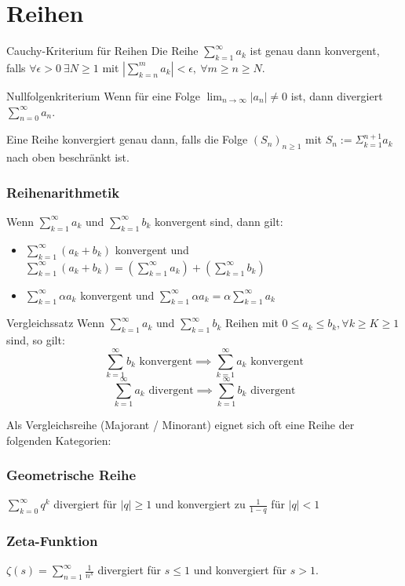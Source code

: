 \documentclass[a4paper,10pt]{article}
\def\limn{\lim_{n\to \infty}}
\def\sumk{\sum_{k=1}^\infty}
\def\sumn{\sum_{n=0}^\infty}
\begin{document}
\section{Reihen}

\begin{mainbox}{Cauchy-Kriterium für Reihen}
Die Reihe $\sumk a_k$ ist genau dann konvergent, falls $\forall \epsilon > 0 \ \exists N \ge 1$ mit $| \sum_{k=n}^m a_k | < \epsilon, \ \forall m \ge n \ge N$.
\end{mainbox}

\begin{subbox}{Nullfolgenkriterium}
 Wenn für eine Folge $\limn |a_n| \ne 0$ ist, dann divergiert $\sumn a_n$.
\end{subbox}

Eine Reihe konvergiert genau dann, falls die Folge $(S_n)_{n \geq 1}$ mit $S_n := \Sigma_{k=1}^{n+1} a_k$ nach oben beschränkt ist.

\subsubsection{Reihenarithmetik}
Wenn $\sumk a_k$ und $\sumk b_k$ konvergent sind, dann gilt:
\begin{itemize}
 \item $\sumk (a_k + b_k)$ konvergent und $\sumk (a_k + b_k) = \left( \sumk a_k \right) + \left( \sumk b_k \right)$
 \item $\sumk \alpha a_k$ konvergent und $\sumk \alpha a_k = \alpha \sumk a_k$
\end{itemize}


\begin{mainbox}{Vergleichssatz}
Wenn $\sumk a_k$ und $\sumk b_k$ Reihen mit $0 \le a_k \le b_k, \forall k \ge K \ge 1$ sind, so gilt:
$$\sumk b_k \text{ konvergent} \implies \sumk a_k \text{ konvergent}$$ 
$$\sumk a_k \text{ divergent} \implies \sumk b_k \text{ divergent}$$ 
\end{mainbox}

Als Vergleichsreihe (Majorant / Minorant) eignet sich oft eine Reihe der folgenden Kategorien:
\subsubsection{Geometrische Reihe} 
$\sum_{k=0}^\infty q^k$ divergiert für $|q| \ge 1$ und konvergiert zu $\frac{1}{1 - q}$ für $|q| < 1$
\subsubsection{Zeta-Funktion}
$\zeta(s) = \sum_{n=1}^\infty \frac{1}{n^s}$ divergiert für $s \le 1$ und konvergiert für $s > 1$.
\end{document}
